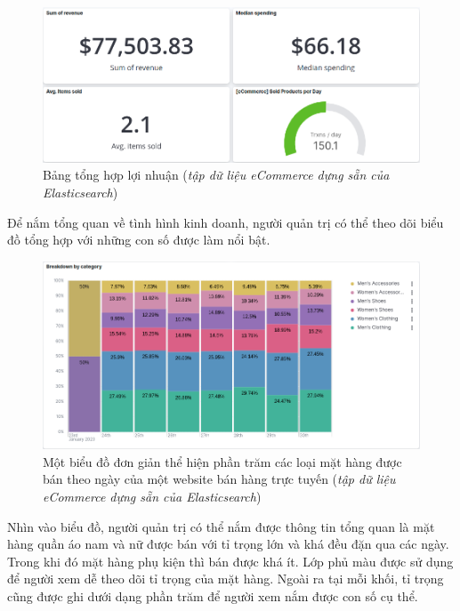 \begin{figure}[H] %
    \centering %
    \includegraphics[width=1\textwidth]{figures/sum_reve.png} 
    \caption{Bảng tổng hợp lợi nhuận (\textit{tập dữ liệu eCommerce dựng sẵn của Elasticsearch})} %
    \label{fig:elk_01}
\end{figure}

Để nắm tổng quan về tình hình kinh doanh, người quản trị có thể theo dõi biểu đồ tổng hợp với những con số được làm nổi bật.

\begin{figure}[H] %
    \centering %
    \includegraphics[width=1\textwidth]{figures/ecom_cat.png} 
    \caption{Một biểu đồ đơn giản thể hiện phần trăm các loại mặt hàng được bán theo ngày của một website bán hàng trực tuyến (\textit{tập dữ liệu eCommerce dựng sẵn của Elasticsearch})} %
    \label{fig:elk_01}
\end{figure}

Nhìn vào biểu đồ, người quản trị có thể nắm được thông tin tổng quan là mặt hàng quần áo nam và nữ được bán với tỉ trọng lớn và khá đều đặn qua các ngày. Trong khi đó mặt hàng phụ kiện thì bán được khá ít. Lớp phủ màu được sử dụng để người xem dễ theo dõi tỉ trọng của mặt hàng. Ngoài ra tại mỗi khối, tỉ trọng cũng được ghi dưới dạng phần trăm để người xem nắm được con số cụ thể. 


